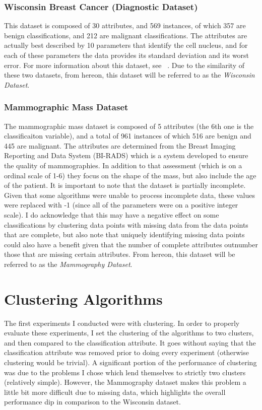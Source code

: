 \documentclass[annual]{acmsiggraph}
\begin{document}
\subsubsection{Wisconsin Breast Cancer (Diagnostic Dataset)}
This dataset is composed of 30 attributes, and 569 instances, of which 357 are benign classifications, and 212 are malignant classifications. The attributes are actually best described by 10 parameters that identify the cell nucleus, and for each of these parameters the data provides its standard deviation and its worst error. For more information about this dataset, see ~\cite{Castro1:2013}. Due to the similarity of these two datasets, from hereon, this dataset will be referred to as the \emph{Wisconsin Dataset}.
\subsubsection{Mammographic Mass Dataset}
The mammographic mass dataset is composed of 5 attributes (the 6th one is the classificaiton variable), and a total of 961 instances of which 516 are benign and 445 are malignant. The attributes are determined from the Breast Imaging Reporting and Data System (BI-RADS) which is a system developed to ensure the quality of mammographies. In addition to that assessment (which is on a ordinal scale of 1-6) they focus on the shape of the mass, but also include the age of the patient. It is important to note that the dataset is partially incomplete. Given that some algorithms were unable to process incomplete data, these values were replaced with -1 (since all of the parameters were on a positive integer scale). I do acknowledge that this may have a negative effect on some classifications by clustering data points with missing data from the data points that are complete, but also note that uniquely identifying missing data points could also have a benefit given that the number of complete attributes outnumber those that are missing certain attributes. From hereon, this dataset will be referred to as the \emph{Mammography Dataset}.
\section{Clustering Algorithms}
The first experiments I conducted were with clustering. In order to properly evaluate these experiments, I set the clustering of the algorithms to two clusters, and then compared to the classification attribute. It goes without saying that the classification attribute was removed prior to doing every experiment (otherwise clustering would be trivial). A significant portion of the performance of clustering was due to the problems I chose which lend themselves to strictly two clusters (relatively simple). However, the Mammography dataset makes this problem a little bit more difficult due to missing data, which highlights the overall performance dip in comparison to the Wisconsin dataset. 
\end{document}

